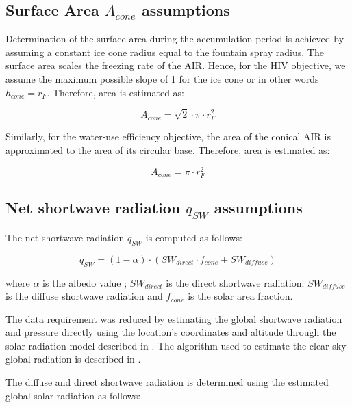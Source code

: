 \documentclass[tc, manuscript]{copernicus}
\begin{document}
\subsection{Surface Area $A_{cone}$ assumptions}

Determination of the surface area during the accumulation period is achieved by assuming a constant ice cone
radius equal to the fountain spray radius. The surface area scales the freezing rate of the AIR. Hence, for the
HIV objective, we assume the maximum possible slope of 1 for the ice cone or in other words $h_{cone} = r_{F}$.
Therefore, area is estimated as:  

\begin{equation} A_{cone} =\sqrt{2} \cdot \pi \cdot r_{F}^2  \end{equation}

Similarly, for the water-use efficiency objective, the area of the conical AIR is approximated to the area of
its circular base. Therefore, area is estimated as:

\begin{equation} A_{cone} =\pi \cdot r_{F}^2  \end{equation}

\subsection{Net shortwave radiation \texorpdfstring{$q_{SW}$}{Lg} assumptions}
\label{sec:SW}

The net shortwave radiation $q_{SW}$ is computed as follows:

\begin{equation} 
q_{SW} = (1- \alpha) \cdot ( SW_{direct} \cdot f_{cone} + SW_{diffuse})
\label{eqn:SW} 
\end{equation}

where $\alpha$ is the albedo value ; $SW_{direct}$ is the direct shortwave radiation; $SW_{diffuse}$ is the
diffuse shortwave radiation and $f_{cone}$ is the solar area fraction.

The data requirement was reduced by estimating the global shortwave radiation and pressure directly using the
location's coordinates and altitude through the solar radiation model described in
\citet{holmgrenPvlibPythonPython2018}. The algorithm used to estimate the clear-sky global radiation is
described in \citet{ineichenBroadbandSimplifiedVersion2008}.  

The diffuse and direct shortwave radiation is determined using the estimated global solar radiation as follows:
\end{document}
